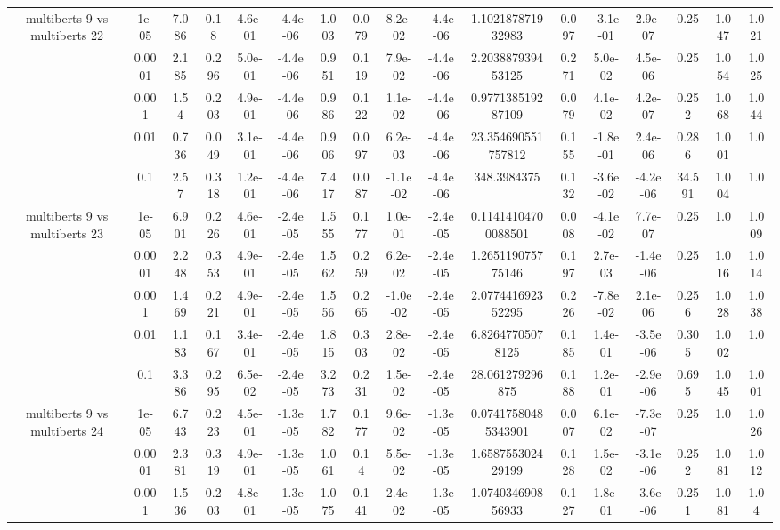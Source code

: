 \begin{tabular}{|c|c|c|c|c|c|c|c|c|c|c|c|c|c|c|c|c|}
\hline
\multirow{5}{*}{multiberts 9 vs multiberts 22} & 1e-05 & 7.086 & 0.18 & 4.6e-01 & -4.4e-06 & 1.003 & 0.079 & 8.2e-02 & -4.4e-06 & 1.102187871932983 & 0.097 & -3.1e-01 & 2.9e-07 & 0.25 & 1.047 & 1.021 \\
 & 0.0001 & 2.185 & 0.296 & 5.0e-01 & -4.4e-06 & 0.951 & 0.119 & 7.9e-02 & -4.4e-06 & 2.203887939453125 & 0.271 & 5.0e-02 & 4.5e-06 & 0.25 & 1.054 & 1.025 \\
 & 0.001 & 1.54 & 0.203 & 4.9e-01 & -4.4e-06 & 0.986 & 0.122 & 1.1e-02 & -4.4e-06 & 0.977138519287109 & 0.079 & 4.1e-02 & 4.2e-07 & 0.252 & 1.068 & 1.044 \\
 & 0.01 & 0.736 & 0.049 & 3.1e-01 & -4.4e-06 & 0.906 & 0.097 & 6.2e-03 & -4.4e-06 & 23.354690551757812 & 0.155 & -1.8e-01 & 2.4e-06 & 0.286 & 1.001 & 1.0 \\
 & 0.1 & 2.57 & 0.318 & 1.2e-01 & -4.4e-06 & 7.417 & 0.087 & -1.1e-02 & -4.4e-06 & 348.3984375 & 0.132 & -3.6e-02 & -4.2e-06 & 34.591 & 1.004 & 1.0 \\
\hline
\multirow{5}{*}{multiberts 9 vs multiberts 23} & 1e-05 & 6.901 & 0.226 & 4.6e-01 & -2.4e-05 & 1.555 & 0.177 & 1.0e-01 & -2.4e-05 & 0.11414104700088501 & 0.008 & -4.1e-02 & 7.7e-07 & 0.25 & 1.0 & 1.009 \\
 & 0.0001 & 2.248 & 0.353 & 4.9e-01 & -2.4e-05 & 1.562 & 0.259 & 6.2e-02 & -2.4e-05 & 1.265119075775146 & 0.197 & 2.7e-03 & -1.4e-06 & 0.25 & 1.016 & 1.014 \\
 & 0.001 & 1.469 & 0.221 & 4.9e-01 & -2.4e-05 & 1.556 & 0.265 & -1.0e-02 & -2.4e-05 & 2.077441692352295 & 0.226 & -7.8e-02 & 2.1e-06 & 0.256 & 1.028 & 1.038 \\
 & 0.01 & 1.183 & 0.167 & 3.4e-01 & -2.4e-05 & 1.815 & 0.303 & 2.8e-02 & -2.4e-05 & 6.82647705078125 & 0.185 & 1.4e-01 & -3.5e-06 & 0.305 & 1.002 & 1.0 \\
 & 0.1 & 3.386 & 0.295 & 6.5e-02 & -2.4e-05 & 3.273 & 0.231 & 1.5e-02 & -2.4e-05 & 28.061279296875 & 0.188 & 1.2e-01 & -2.9e-06 & 0.695 & 1.045 & 1.001 \\
\hline
\multirow{5}{*}{multiberts 9 vs multiberts 24} & 1e-05 & 6.743 & 0.223 & 4.5e-01 & -1.3e-05 & 1.782 & 0.177 & 9.6e-02 & -1.3e-05 & 0.07417580485343901 & 0.007 & 6.1e-02 & -7.3e-07 & 0.25 & 1.0 & 1.026 \\
 & 0.0001 & 2.381 & 0.319 & 4.9e-01 & -1.3e-05 & 1.061 & 0.14 & 5.5e-02 & -1.3e-05 & 1.658755302429199 & 0.128 & 1.5e-02 & -3.1e-06 & 0.252 & 1.081 & 1.012 \\
 & 0.001 & 1.536 & 0.203 & 4.8e-01 & -1.3e-05 & 1.075 & 0.141 & 2.4e-02 & -1.3e-05 & 1.074034690856933 & 0.127 & 1.8e-01 & -3.6e-06 & 0.251 & 1.081 & 1.04 \\

\end{tabular}
